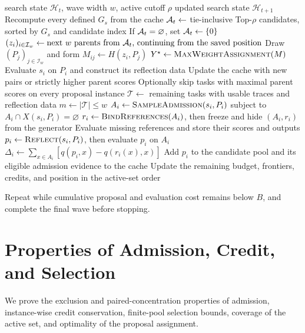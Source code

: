 \begin{algorithm}[H]
\caption{One \method{} wave}
\label{alg:compass_wave}
\begin{algorithmic}[1]
\Require search state $\mathcal H_t$, wave width $w$, active cutoff $\rho$
\Ensure updated search state $\mathcal H_{t+1}$
\State Recompute every defined $G_s$ from the cache
\State $\mathcal{A}_t \gets$ tie-inclusive Top-$\rho$ candidates, sorted by $G_s$ and candidate index
\State If $\mathcal{A}_t=\varnothing$, set $\mathcal{A}_t\gets\{0\}$ 
\State $(z_i)_{i\in\mathcal I_w} \gets \text{next $w$ parents from $\mathcal{A}_t$, continuing from the saved position}$
\State Draw $(P_j)_{j\in\mathcal I_w}$ and form $M_{ij}\gets H(z_i,P_j)$
\State $Y^\star \gets \Call{MaxWeightAssignment}{M}$
  \State Evaluate $s_i$ on $P_i$ and construct its reflection data
  \State Update the cache with new pairs or strictly higher parent scores
\EndFor
\State Optionally skip tasks with maximal parent scores on every proposal instance
\State $\mathcal T\gets$ remaining tasks with usable traces and reflection data
\State $m\gets|\mathcal T|\le w$
  \State $A_i\gets\Call{SampleAdmission}{s_i,P_i}$ subject to $A_i\cap X(s_i,P_i)=\varnothing$
  \State $r_i\gets\Call{BindReferences}{A_i}$, then freeze and hide $(A_i,r_i)$ from the generator
  \State Evaluate missing references and store their scores and outputs
  \State $p_i\gets\Call{Reflect}{s_i,P_i}$, then evaluate $p_i$ on $A_i$
  \State $\Delta_i\gets\sum_{x\in A_i}[q(p_i,x)-q(r_i(x),x)]$
    \State Add $p_i$ to the candidate pool and its eligible admission evidence to the cache
  \EndIf
\EndFor
\State Update the remaining budget, frontiers, credits, and position in the active-set order
\end{algorithmic}
\end{algorithm}

Repeat  while cumulative proposal and evaluation cost
remains below $B$, and complete the final wave before stopping.

\section{Properties of Admission, Credit, and Selection}
\label{app:proofs}

We prove the exclusion and paired-concentration properties of admission,
instance-wise credit conservation, finite-pool selection bounds, coverage of
the active set, and optimality of the proposal assignment.


